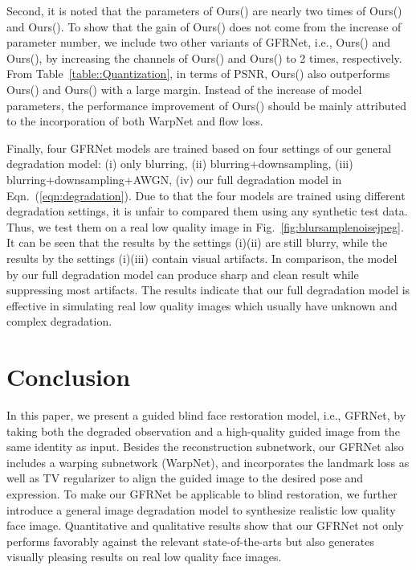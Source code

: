 \documentclass[runningheads]{llncs}
\begin{document}
Second, it is noted that the parameters of Ours() are nearly two times of Ours() and Ours().
To show that the gain of Ours() does not come from the increase of parameter number, we include two other variants of GFRNet, i.e., Ours() and Ours(), by increasing the channels of Ours() and Ours() to 2 times, respectively.
From Table~\ref{table::Quantization}, in terms of PSNR, Ours() also outperforms Ours() and Ours() with a large margin.
Instead of the increase of model parameters, the performance improvement of Ours() should be mainly attributed to the incorporation of both WarpNet and flow loss.


Finally, four GFRNet models are trained based on four settings of our general degradation model: (i) only blurring, (ii) blurring+downsampling, (iii) blurring+downsampling+AWGN, (iv) our full degradation model in Eqn.~(\ref{eqn:degradation}).
Due to that the four models are trained using different degradation settings, it is unfair to compared them using any synthetic test data.
Thus, we test them on a real low quality image in Fig.~\ref{fig:blursamplenoisejpeg}.
It can be seen that the results by the settings (i)(ii) are still blurry, while the results by the settings {(i)(iii)} contain visual artifacts.
In comparison, the model by our full degradation model can produce sharp and clean result while suppressing most artifacts.
The results indicate that our full degradation model is effective in simulating real low quality images which usually have unknown and complex degradation.

\section{Conclusion}\label{section5}
In this paper, we present a guided blind face restoration model, i.e., GFRNet, by taking both the degraded observation and a high-quality guided image from the same identity as input.
Besides the reconstruction subnetwork, our GFRNet also includes a warping subnetwork (WarpNet), and incorporates the landmark loss as well as TV regularizer to align the guided image to the desired pose and expression.
To make our GFRNet be applicable to blind restoration, we further introduce a general image degradation model to synthesize realistic low quality face image.
Quantitative and qualitative results show that our GFRNet not only performs favorably against the relevant state-of-the-arts but also generates visually pleasing results on real low quality face images.
\clearpage


\end{document}
